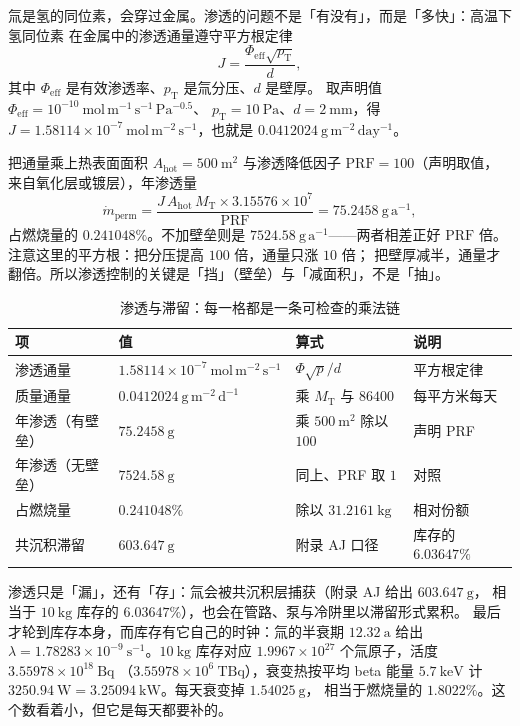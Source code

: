 氚是氢的同位素，会穿过金属。渗透的问题不是「有没有」，而是「多快」：高温下氢同位素
在金属中的渗透通量遵守平方根定律
\begin{equation}
J=\frac{\Phi_\mathrm{eff}\sqrt{p_\mathrm{T}}}{d},
\label{eq:app-av-perm}
\end{equation}
其中 $\Phi_\mathrm{eff}$ 是有效渗透率、$p_\mathrm{T}$ 是氚分压、$d$ 是壁厚。
取声明值 $\Phi_\mathrm{eff}=10^{-10}\ \mathrm{mol\,m^{-1}\,s^{-1}\,Pa^{-0.5}}$、
$p_\mathrm{T}=10\ \mathrm{Pa}$、$d=2\ \mathrm{mm}$，得
$J=1.58114\times10^{-7}\ \mathrm{mol\,m^{-2}\,s^{-1}}$，也就是
$0.0412024\ \mathrm{g\,m^{-2}\,day^{-1}}$。

把通量乘上热表面面积 $A_\mathrm{hot}=500\ \mathrm{m^{2}}$ 与渗透降低因子
$\mathrm{PRF}=100$（声明取值，来自氧化层或镀层），年渗透量
\begin{equation}
\dot m_\mathrm{perm}=\frac{J\,A_\mathrm{hot}\,M_\mathrm{T}\times3.15576\times10^{7}}{\mathrm{PRF}}
=75.2458\ \mathrm{g\,a^{-1}},
\label{eq:app-av-decay}
\end{equation}
占燃烧量的 $0.241048\%$。不加壁垒则是 $7524.58\ \mathrm{g\,a^{-1}}$——两者相差正好
$\mathrm{PRF}$ 倍。注意这里的平方根：把分压提高 $100$ 倍，通量只涨 $10$ 倍；
把壁厚减半，通量才翻倍。所以渗透控制的关键是「挡」（壁垒）与「减面积」，不是「抽」。

\begin{table}[htbp]
\centering
\small
\caption{渗透与滞留：每一格都是一条可检查的乘法链}
\label{tab:app-av-permeation}
\begin{tabular}{p{3.4cm}p{3.4cm}p{3.6cm}p{4.2cm}}
\hline
项 & 值 & 算式 & 说明 \\
\hline
渗透通量 & $1.58114\times10^{-7}\ \mathrm{mol\,m^{-2}\,s^{-1}}$ & $\Phi\sqrt{p}/d$ & 平方根定律 \\
质量通量 & $0.0412024\ \mathrm{g\,m^{-2}\,d^{-1}}$ & 乘 $M_\mathrm{T}$ 与 $86400$ & 每平方米每天 \\
年渗透（有壁垒） & $75.2458\ \mathrm{g}$ & 乘 $500\ \mathrm{m^{2}}$ 除以 $100$ & 声明 PRF \\
年渗透（无壁垒） & $7524.58\ \mathrm{g}$ & 同上、PRF 取 $1$ & 对照 \\
占燃烧量 & $0.241048\%$ & 除以 $31.2161\ \mathrm{kg}$ & 相对份额 \\
共沉积滞留 & $603.647\ \mathrm{g}$ & 附录 AJ 口径 & 库存的 $6.03647\%$ \\
\hline
\end{tabular}
\end{table}

渗透只是「漏」，还有「存」：氚会被共沉积层捕获（附录 AJ 给出 $603.647\ \mathrm{g}$，
相当于 $10\ \mathrm{kg}$ 库存的 $6.03647\%$），也会在管路、泵与冷阱里以滞留形式累积。
最后才轮到库存本身，而库存有它自己的时钟：氚的半衰期 $12.32\ \mathrm{a}$ 给出
$\lambda=1.78283\times10^{-9}\ \mathrm{s^{-1}}$。$10\ \mathrm{kg}$ 库存对应
$1.9967\times10^{27}$ 个氚原子，活度 $3.55978\times10^{18}\ \mathrm{Bq}$
（$3.55978\times10^{6}\ \mathrm{TBq}$），衰变热按平均 beta 能量 $5.7\ \mathrm{keV}$ 计
$3250.94\ \mathrm{W}=3.25094\ \mathrm{kW}$。每天衰变掉 $1.54025\ \mathrm{g}$，
相当于燃烧量的 $1.8022\%$。这个数看着小，但它是每天都要补的。

